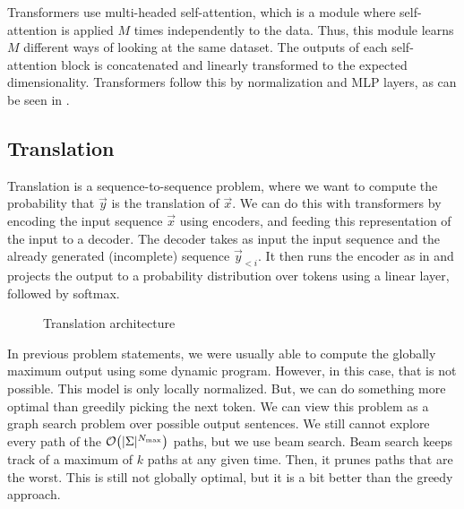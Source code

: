 Transformers \citep{vaswani2017attention} use multi-headed self-attention,
which is a module where self-attention is applied $M$ times independently to
the data. Thus, this module learns $M$ different ways of looking at the same
dataset. The outputs of each self-attention block is concatenated and linearly
transformed to the expected dimensionality. Transformers follow this by
normalization and MLP layers, as can be seen in .

\subsection{Translation}

Translation is a sequence-to-sequence problem, where we want to compute the
probability that $\vec{y}$ is the translation of $\vec{x}$. We can do this with
transformers by encoding the input sequence $\vec{x}$ using encoders, and
feeding this representation of the input to a decoder. The decoder takes as
input the input sequence and the already generated (incomplete) sequence
$\vec{y}_{<i}$. It then runs the encoder as in  and
projects the output to a probability distribution over tokens using a linear
layer, followed by softmax.

\begin{figure}[ht]
    \centering
    \caption{Translation architecture}
    \label{fig:translation-architecture}
\end{figure}

In previous problem statements, we were usually able to compute the globally
maximum output using some dynamic program. However, in this case, that is not
possible. This model is only locally normalized. But, we can do something more
optimal than greedily picking the next token. We can view this problem as a
graph search problem over possible output sentences. We still cannot explore
every path of the $\bigo{|\Sigma|^{N_{\max}}}$ paths, but we use beam search.
Beam search keeps track of a maximum of $k$ paths at any given time. Then, it
prunes paths that are the worst. This is still not globally optimal, but it is
a bit better than the greedy approach.
